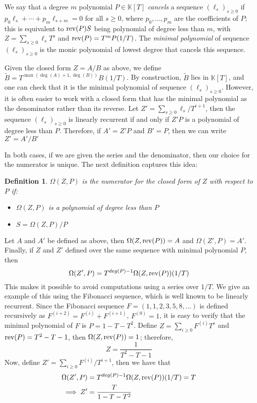 \documentclass[12pt]{article}
\def\K {\ensuremath{\mathbb{K}}}
\newtheorem{definition}{Definition}
\def\K{\mathbb{K}}
\begin{document}
We say that a degree $m$ polynomial $P\in\K[T]$ {\em cancels} a
sequence $(\ell_s)_{s \ge 0}$ if $p_0 \ell_s + \cdots + p_m
\ell_{s+m}=0$ for all $s \ge 0$, where $p_0,\dots,p_m$ are the
coefficients of $P$; this is equivalent to ${\rm rev}(P) S$ being
polynomial of degree less than $m$, with $Z=\sum_{s \ge 0} \ell_s T^s$
and ${\rm rev}(P)=T^m P(1/T)$. The {\em minimal polynomial} of
sequence $(\ell_s)_{s \ge 0}$ is the monic polynomial of lowest degree
that cancels this sequence. 

Given the closed form $Z =  A/B$ as above, we define $\tilde B =
T^{\max(\deg(A)+1,\deg(B))}B(1/T)$.  By construction, $\tilde B$ lies
in $\K[T]$, and one can check that it is the minimal polynomial of
sequence $(\ell_s)_{s \ge 0}$. However, it is often easier to work with a 
closed form that has the minimal polynomial as the denominator rather than
its reverse. Let $Z' = \sum_{s\ge0} \ell_s / T^{i+1}$, then the sequence 
$(\ell_s)_{s\ge0}$ is linearly recurrent if and only if $Z'P$ is a polynomial
of degree less than $P$. Therefore, if $A' = Z'P$ and $B' = P$, then we
can write $Z' = A'/B'$

In both cases, if we are given the series and the denominator, then our 
choice for the numerator is unique. The next definition captures this idea:
\begin{definition}
	\label{def:omega}
	$\Omega(Z,P)$ is the numerator for the closed form of $Z$ with respect
	to $P$ if:
	\begin{itemize}
		\item $\Omega(Z,P)$ is a polynomial of degree less than $P$
		\item $S = \Omega(Z,P)/P$
	\end{itemize}
\end{definition}
\noindent Let $A$ and $A'$ be defined as above, then 
$\Omega(Z,{\rm rev}(P)) = A$ and $\Omega(Z',P) = A'$. Finally, 
if $Z$ and $Z'$ defined over the same sequence with 
minimal polynomial $P$, then
$$\Omega(Z',P) = T^{deg(P) - 1} \Omega(Z,{\rm rev}(P) )(1/T)$$
\noindent This makes it possible to avoid computations using a series
over $1/T$. We give an example of this using
the Fibonacci sequence, which is well known to be linearly recurrent. Since 
the Fibonacci sequence $F = (1,1,2,3,5,8,\dots)$ is defined
recursively as $F^{(i+2)} = F^{(i)} + F^{(i+1)}$, $F^{(0)} = 1$, it is
easy to verify that the minimal polynomial of $F$ is $P = 1-T-T^2$.
Define $Z = \sum_{i\ge 0} F^{(i)} T^s$ and ${\rm rev}(P) = T^2-T-1$, then
$\Omega(Z,{\rm rev}(P)) = 1$; therefore,
$$Z = \frac{1}{T^2-T-1}$$
\noindent Now, define $Z' = \sum_{i\ge0} F^{(i)}/T^{i+1}$, then we have that
\begin{align*}
\Omega(Z',P)& = T^{deg(P)-1}\Omega(Z,{\rm rev}(P))(1/T) = T\\
\implies Z' &= \frac{T}{1-T-T^2}
\end{align*}
\end{document}
